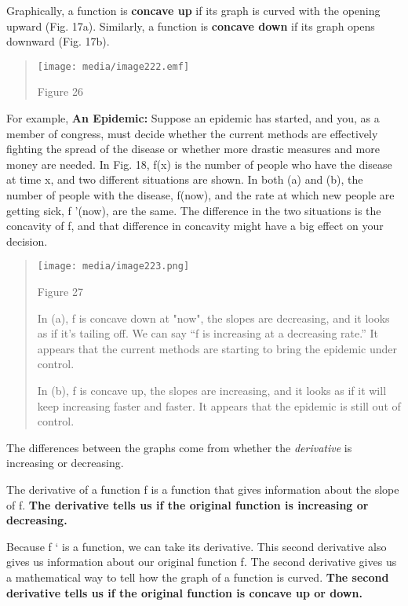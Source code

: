 Graphically, a function is \textbf{concave up} if its graph is curved
with the opening upward (Fig. 17a). Similarly, a function is
\textbf{concave down} if its graph opens downward (Fig. 17b).

\begin{quote}
\texttt{[image: media/image222.emf]}

Figure 26
\end{quote}

For example, \textbf{An Epidemic:} Suppose an epidemic has started, and
you, as a member of congress, must decide whether the current methods
are effectively fighting the spread of the disease or whether more
drastic measures and more money are needed. In Fig. 18, f(x) is the
number of people who have the disease at time x, and two different
situations are shown. In both (a) and (b), the number of people with the
disease, f(now), and the rate at which new people are getting sick, f
'(now), are the same. The difference in the two situations is the
concavity of f, and that difference in concavity might have a big effect
on your decision.

\begin{quote}
\texttt{[image: media/image223.png]}

Figure 27

In (a), f is concave down at "now", the slopes are decreasing, and it
looks as if it's tailing off. We can say ``f is increasing at a
decreasing rate.'' It appears that the current methods are starting to
bring the epidemic under control.

In (b), f is concave up, the slopes are increasing, and it looks as if
it will keep increasing faster and faster. It appears that the epidemic
is still out of control.
\end{quote}

The differences between the graphs come from whether the
\emph{derivative} is increasing or decreasing.

The derivative of a function f is a function that gives information
about the slope of f. \textbf{The derivative tells us if the original
function is increasing or decreasing.}

Because f ` is a function, we can take its derivative. This second
derivative also gives us information about our original function f. The
second derivative gives us a mathematical way to tell how the graph of a
function is curved. \textbf{The second derivative tells us if the
original function is concave up or down.}

